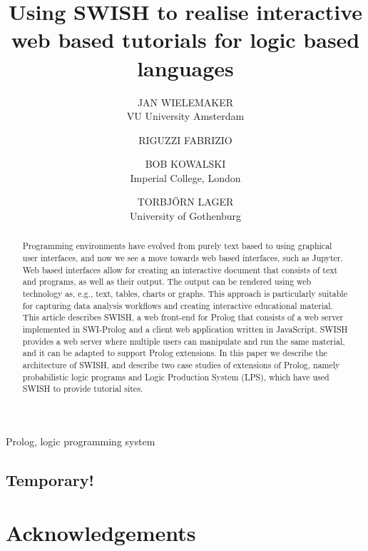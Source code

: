 \documentclass{tlp}
\begin{document}


\title{Using SWISH to realise interactive web based tutorials for
       logic based languages}

\author[J. Wielemaker et al.]
{JAN WIELEMAKER \\
VU University Amsterdam\\
\and
RIGUZZI FABRIZIO \\
\and
BOB KOWALSKI \\
Imperial College, London\\
\and
TORBJ\"ORN LAGER \\
University of Gothenburg\\
}

\pagerange{\pageref{firstpage}--\pageref{lastpage}}
\setcounter{page}{1}

\maketitle
\begin{abstract}
Programming environments have evolved from purely text based to using
graphical user interfaces, and now we see a move towards web based
interfaces, such as Jupyter. Web based interfaces allow for creating an
interactive document that consists of text and programs, as well as
their output. The output can be rendered using web technology as, e.g.,
text, tables, charts or graphs. This approach is particularly suitable
for capturing data analysis workflows and creating interactive
educational material. This article describes SWISH, a web front-end for
Prolog that consists of a web server implemented in SWI-Prolog and a
client web application written in JavaScript. SWISH provides a web
server where multiple users can manipulate and run the same material,
and it can be adapted to support Prolog extensions. In this paper we
describe the architecture of SWISH, and describe two case studies of
extensions of Prolog, namely probabilistic logic programs and Logic
Production System (LPS), which have used SWISH to provide tutorial
sites.
\end{abstract}


\begin{keywords}
Prolog, logic programming system
\end{keywords}

\newpage
\subsection*{Temporary!}
\tableofcontents
\newpage









\section*{Acknowledgements}


\end{document}
